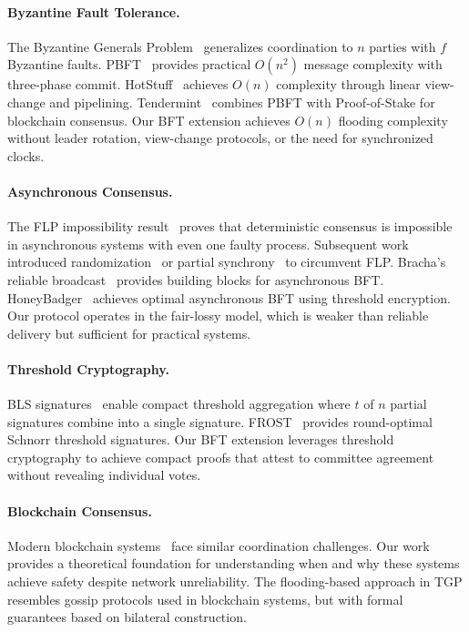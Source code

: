 \paragraph{Byzantine Fault Tolerance.}
The Byzantine Generals Problem~\cite{lamport1982byzantine} generalizes coordination to $n$ parties with $f$ Byzantine faults. PBFT~\cite{castro1999practical} provides practical $O(n^2)$ message complexity with three-phase commit. HotStuff~\cite{yin2019hotstuff} achieves $O(n)$ complexity through linear view-change and pipelining. Tendermint~\cite{buchman2016tendermint} combines PBFT with Proof-of-Stake for blockchain consensus. Our BFT extension achieves $O(n)$ flooding complexity without leader rotation, view-change protocols, or the need for synchronized clocks.

\paragraph{Asynchronous Consensus.}
The FLP impossibility result~\cite{fischer1985impossibility} proves that deterministic consensus is impossible in asynchronous systems with even one faulty process. Subsequent work introduced randomization~\cite{benor1983another} or partial synchrony~\cite{dwork1988consensus} to circumvent FLP. Bracha's reliable broadcast~\cite{bracha1987asynchronous} provides building blocks for asynchronous BFT. HoneyBadger~\cite{miller2016honey} achieves optimal asynchronous BFT using threshold encryption. Our protocol operates in the fair-lossy model, which is weaker than reliable delivery but sufficient for practical systems.

\paragraph{Threshold Cryptography.}
BLS signatures~\cite{boneh2001short} enable compact threshold aggregation where $t$ of $n$ partial signatures combine into a single signature. FROST~\cite{komlo2020frost} provides round-optimal Schnorr threshold signatures. Our BFT extension leverages threshold cryptography to achieve compact proofs that attest to committee agreement without revealing individual votes.

\paragraph{Blockchain Consensus.}
Modern blockchain systems~\cite{cachin2016blockchain} face similar coordination challenges. Our work provides a theoretical foundation for understanding when and why these systems achieve safety despite network unreliability. The flooding-based approach in TGP resembles gossip protocols used in blockchain systems, but with formal guarantees based on bilateral construction.
